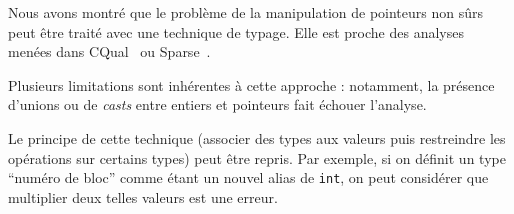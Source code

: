 
Nous avons montré que le problème de la manipulation de pointeurs non sûrs peut
être traité avec une technique de typage. Elle est proche des analyses menées
dans CQual~\cite{pldi99} ou Sparse~.


Plusieurs limitations sont inhérentes à cette approche : notamment, la présence
d'unions ou de \emph{casts} entre entiers et pointeurs fait échouer l'analyse.


Le principe de cette technique (associer des types aux valeurs puis restreindre
les opérations sur certains types) peut être repris. Par exemple, si on définit
un type ``numéro de bloc'' comme étant un nouvel alias de \texttt{int}, on peut
considérer que multiplier deux telles valeurs est une erreur.
